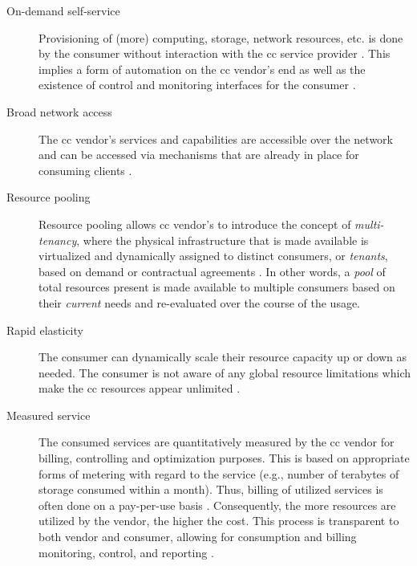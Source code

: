 \begin{description}
	\item[On-demand self-service] Provisioning of (more) computing, storage, network resources, etc. is done by the consumer without interaction with the \ac{cc} service provider \cite{mell_nist_2011}. This implies a form of automation on the \ac{cc} vendor's end as well as the existence of control and monitoring interfaces for the consumer \cite[p.\ 51]{sehgal_cloud_2018}. 
	\item[Broad network access] The \ac{cc} vendor's services and capabilities are accessible over the network and can be accessed via mechanisms that are already in place for consuming clients \cites{mell_nist_2011}[p.\ 45]{sehgal_cloud_2018}.
	\item[Resource pooling] Resource pooling allows \ac{cc} vendor's to introduce the concept of \textit{multi-tenancy}, where the physical infrastructure that is made available is virtualized and dynamically assigned to distinct consumers, or \textit{tenants}, based on demand or contractual agreements \cites{mell_nist_2011}[p.\ 45]{sehgal_cloud_2018}. 
		In other words, a \textit{pool} of total resources present is made available to multiple consumers based on their \textit{current} needs and re-evaluated over the course of the usage.
	\item[Rapid elasticity] The consumer can dynamically scale their resource capacity up or down as needed. The consumer is not aware of any global resource limitations which make the \ac{cc} resources appear unlimited \cite{mell_nist_2011}.
	\item[Measured service] The consumed services are quantitatively measured by the \ac{cc} vendor for billing, controlling and optimization purposes. This is based on appropriate forms of metering with regard to the service (e.g., number of terabytes of storage consumed within a month). Thus, billing of utilized services is often done on a pay-per-use basis \cite{mell_nist_2011}. Consequently, the more resources are utilized by the vendor, the higher the cost. This process is transparent to both vendor and consumer, allowing for consumption and billing monitoring, control, and reporting \cite{mell_nist_2011}.
\end{description}
